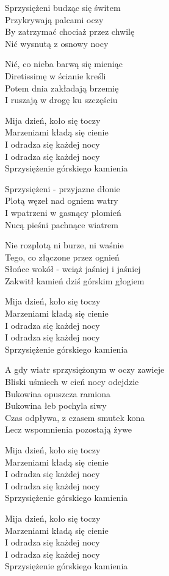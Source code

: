 \begin{text}
    Sprzysiężeni budząc się świtem\\
    Przykrywają palcami oczy\\
    By zatrzymać chociaż przez chwilę\\
    Nić wysnutą z osnowy nocy

    Nić, co nieba barwą się mieniąc\\
    Diretissimę w ścianie kreśli\\
    Potem dnia zakładają brzemię\\
    I ruszają w drogę ku szczęściu

    Mija dzień, koło się toczy\\
    Marzeniami kładą się cienie\\
    I odradza się każdej nocy\\
    I odradza się każdej nocy\\
    Sprzysiężenie górskiego kamienia

    Sprzysiężeni - przyjazne dłonie\\
    Plotą węzeł nad ogniem watry\\
    I wpatrzeni w gasnący płomień\\
    Nucą pieśni pachnące wiatrem

    Nie rozplotą ni burze, ni waśnie\\
    Tego, co złączone przez ognień\\
    Słońce wokół - wciąż jaśniej i jaśniej\\
    Zakwitł kamień dziś górskim głogiem

    Mija dzień, koło się toczy\\
    Marzeniami kładą się cienie\\
    I odradza się każdej nocy\\
    I odradza się każdej nocy\\
    Sprzysiężenie górskiego kamienia

    A gdy wiatr sprzysiężonym w oczy zawieje\\
    Bliski uśmiech w cień nocy odejdzie\\
    Bukowina opuszcza ramiona\\
    Bukowina łeb pochyla siwy\\
    Czas odpływa, z czasem smutek kona\\
    Lecz wspomnienia pozostają żywe

    Mija dzień, koło się toczy\\
    Marzeniami kładą się cienie\\
    I odradza się każdej nocy\\
    I odradza się każdej nocy\\
    Sprzysiężenie górskiego kamienia

    Mija dzień, koło się toczy\\
    Marzeniami kładą się cienie\\
    I odradza się każdej nocy\\
    I odradza się każdej nocy\\
    Sprzysiężenie górskiego kamienia
\end{text}
\begin{chord}

\end{chord}